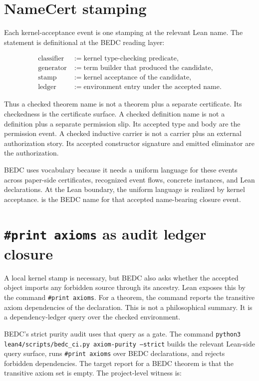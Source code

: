 \section{NameCert stamping}
\label{sec:kernel-audit-witness-namecert-stamping}

Each kernel-acceptance event is one \NameCert{} stamping at the relevant Lean
name. The statement is definitional at the BEDC reading layer:

$$
\begin{aligned}
\text{classifier}
&:= \text{kernel type-checking predicate},\\
\text{generator}
&:= \text{term builder that produced the candidate},\\
\text{stamp}
&:= \text{kernel acceptance of the candidate},\\
\text{ledger}
&:= \text{environment entry under the accepted name}.
\end{aligned}
$$

Thus a checked theorem name is not a theorem plus a separate certificate. Its
checkedness is the certificate surface. A checked definition name is not a
definition plus a separate permission slip. Its accepted type and body are the
permission event. A checked inductive carrier is not a carrier plus an external
authorization story. Its accepted constructor signature and emitted eliminator
are the authorization.

BEDC uses \NameCert{} vocabulary because it needs a uniform language for these
events across paper-side certificates, recognized event flows, concrete
instances, and Lean declarations. At the Lean boundary, the uniform language is
realized by kernel acceptance. \NameCert{} is the BEDC name for that accepted
name-bearing closure event.

\section{\texttt{\#print axioms} as audit ledger closure}
\label{sec:kernel-audit-witness-print-axioms}

A local kernel stamp is necessary, but BEDC also asks whether the accepted
object imports any forbidden source through its ancestry. Lean exposes this by
the command \texttt{\#print axioms}. For a theorem, the command reports the
transitive axiom dependencies of the declaration. This is not a philosophical
summary. It is a dependency-ledger query over the checked environment.

BEDC's strict purity audit uses that query as a gate. The command
\texttt{python3 lean4/scripts/bedc\_ci.py axiom-purity --strict} builds the
relevant Lean-side query surface, runs \texttt{\#print axioms} over BEDC
declarations, and rejects forbidden dependencies. The target report for a BEDC
theorem is that the transitive axiom set is empty. The project-level witness is:

